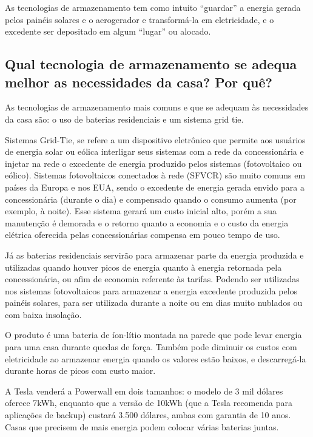 	As tecnologias de armazenamento tem como intuito “guardar” a energia gerada pelos painéis solares e o aerogerador e transformá-la em eletricidade, e o excedente ser depositado em algum “lugar” ou alocado. 

\subsection{Qual tecnologia de armazenamento se adequa melhor as necessidades da casa? Por quê?}

	As tecnologias de armazenamento mais comuns e que se adequam às necessidades da casa são: o uso de baterias residenciais e um sistema grid tie.
	 
	Sistemas Grid-Tie, se refere a um dispositivo eletrônico que permite aos 
usuários de energia solar ou eólica interligar seus sistemas com a rede da 
concessionária e injetar na rede o excedente de energia produzido pelos 
sistemas (fotovoltaico ou eólico).\cite{neosolarinversorfronius} Sistemas 
fotovoltaicos conectados à rede (SFVCR) são muito comuns em países da Europa e 
nos EUA, sendo o excedente de energia gerada envido para a concessionária 
(durante o dia) e compensado quando o consumo aumenta (por exemplo, à noite). 
Esse sistema gerará um custo inicial alto, porém a sua manutenção é demorada e 
o retorno quanto a economia e o custo da energia elétrica oferecida pelas 
concessionárias compensa em pouco tempo de uso.
	
	Já as baterias residenciais servirão para armazenar parte da energia produzida e utilizadas quando houver picos de energia quanto à energia retornada pela concessionária, ou afim de economia referente às tarifas. Podendo ser utilizadas nos sistemas fotovoltaicos para armazenar a energia excedente produzida pelos painéis solares, para ser utilizada durante a noite ou em dias muito nublados ou com baixa insolação. \cite{minhacasasolar}

	O produto é uma bateria de íon-lítio montada na parede que pode levar energia para uma casa durante quedas de força. Também pode diminuir os custos com eletricidade ao armazenar energia quando os valores estão baixos, e descarregá-la durante horas de picos com custo maior. 

	A Tesla venderá a Powerwall em dois tamanhos: o modelo de 3 mil dólares oferece 7kWh, enquanto que a versão de 10kWh (que a Tesla recomenda para aplicações de backup) custará 3.500 dólares, ambas com garantia de 10 anos. Casas que precisem de mais energia podem colocar várias baterias juntas.\cite{Powerwall}

